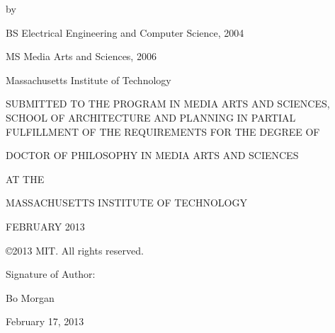 \thispagestyle{empty}

\begin{addmargin}[1cm]{-2cm}
\begin{center}
    \begingroup
        \color{Maroon}\spacedallcaps{\myTitle}
    \endgroup

    \vspace{2mm}

    by

    \vspace{2mm}

    \myName

    \vspace{6mm}
    
    BS Electrical Engineering and Computer Science, 2004
    
    MS Media Arts and Sciences, 2006

    Massachusetts Institute of Technology
    
    \vspace{6mm}

 SUBMITTED TO THE PROGRAM IN MEDIA ARTS AND SCIENCES, SCHOOL OF
 ARCHITECTURE AND PLANNING IN PARTIAL FULFILLMENT OF THE REQUIREMENTS
 FOR THE DEGREE OF

    \vspace{6mm}

DOCTOR OF PHILOSOPHY IN MEDIA ARTS AND SCIENCES

AT THE

MASSACHUSETTS INSTITUTE OF TECHNOLOGY

    \vspace{6mm}

FEBRUARY 2013

    \vspace{6mm}

\copyright 2013 MIT.  All rights reserved.

\end{center}        


\begin{flushright}
  \vspace{15mm}

  Signature of Author:\hspace{0.5cm}~\makebox[2.75in]{\hrulefill}

Bo Morgan

February 17, 2013
                          
  \vspace{15mm}
  

\end{flushright}
\end{addmargin}
